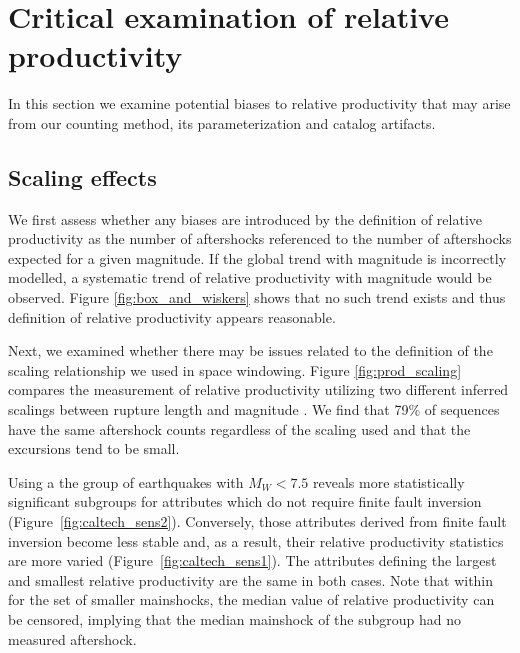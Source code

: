 \documentclass[draft]{agujournal}
\begin{document}
\section{Critical examination of relative productivity}
\label{sec:Critical}

In this section we  examine potential biases to relative productivity that may arise from our counting method, its parameterization and catalog artifacts.

\subsection{Scaling effects}\label{sec:scaling}

We first assess whether any biases are introduced by the definition of relative productivity as the number of aftershocks referenced to the number of aftershocks expected for a given magnitude. If the global trend with magnitude is incorrectly modelled, a systematic trend of relative productivity with magnitude would be observed. Figure \ref{fig:box_and_wiskers} shows that no such trend exists and thus definition of relative productivity appears reasonable.

Next, we examined whether there may be issues related to the definition of the scaling relationship we used in space windowing. Figure \ref{fig:prod_scaling} compares the measurement of relative productivity utilizing two different inferred scalings between rupture length and magnitude \citep{Brengman2019EarthquakeScalingDistributions,Wells1994}. We find that 79\% of sequences have the same aftershock counts regardless of the scaling used and that the excursions tend to be small.

Using a the group of earthquakes with $M_W<7.5$ reveals more statistically significant subgroups for attributes which do not require finite fault inversion (Figure~\ref{fig:caltech_sens2}). Conversely, those attributes derived from finite fault inversion become less stable and, as a result, their relative productivity statistics are more varied (Figure~\ref{fig:caltech_sens1}). The attributes defining the largest and smallest relative productivity are the same in both cases.  Note that within for the set of smaller mainshocks, the median value of relative productivity can be censored, implying that the median mainshock of the subgroup had no measured aftershock.
\end{document}
